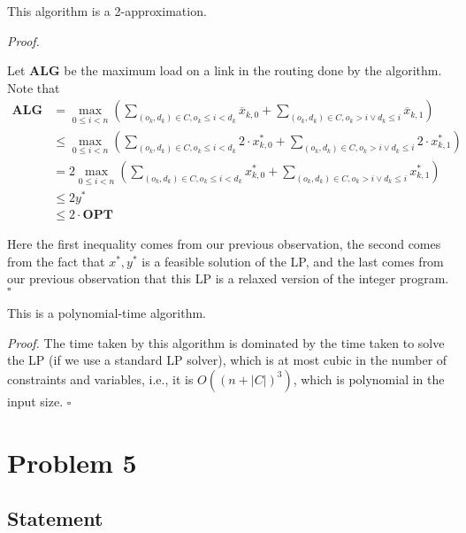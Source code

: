 \documentclass[a4paper]{article}
\newenvironment{proof}{\begin{breakbox}\textit{Proof.}}{\hfill$\square$\end{breakbox}}
\newcommand{\OPT}{\mathbf{OPT}}
\newcommand{\ALG}{\mathbf{ALG}}
\begin{document}
\begin{claim}
    This algorithm is a 2-approximation.
\end{claim}
\begin{proof}
    
Let $\ALG$ be the maximum load on a link in the routing done by the algorithm.
Note that
\begin{align*}
    \ALG &= \max_{0 \le i < n} \left(\sum_{(o_k, d_k) \in C, o_k \le i < d_k} \overline{x}_{k, 0} + \sum_{(o_k, d_k) \in C, o_k > i \lor d_k \le i} \overline{x}_{k, 1}\right)\\
        &\le \max_{0 \le i <
n} \left(\sum_{(o_k, d_k) \in C, o_k \le i < d_k} 2 \cdot x^*_{k, 0} + \sum_{(o_k, d_k) \in C, o_k > i \lor d_k \le i} 2 \cdot x^*_{k, 1}\right)\\
        &= 2 \max_{0 \le i < n} \left(\sum_{(o_k, d_k) \in C, o_k \le i < d_k} x^*_{k, 0} + \sum_{(o_k, d_k) \in C, o_k > i \lor d_k \le i} x^*_{k, 1}\right)\\
        &\le 2y^*\\
        &\le 2 \cdot \OPT
\end{align*}

Here the first inequality comes from our previous observation, the second comes from the fact that $x^*, y^*$ is a feasible solution of the LP, and the last comes from our previous observation
that this LP is a relaxed version of the integer program.
\end{proof}

\begin{claim}
    This is a polynomial-time algorithm.
\end{claim}
\begin{proof}
The time taken by this algorithm is dominated by the time taken to solve the LP (if we use a standard LP solver), which is at most cubic in the number of constraints and variables, i.e., it is $O((n + |C|)^3)$, which is polynomial in the input size.
\end{proof}
\newpage

\section{Problem 5}

\subsection{Statement}
\end{document}

